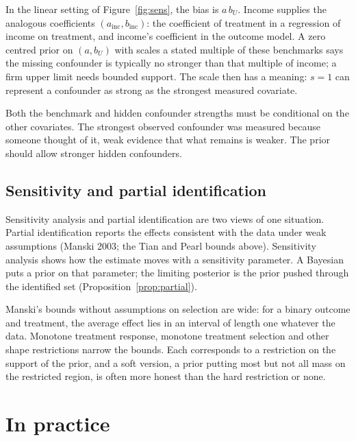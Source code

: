 In the linear setting of Figure~\ref{fig:sens}, the bias is $a\,b_U$. Income supplies the analogous coefficients $(a_{\mathrm{inc}}, b_{\mathrm{inc}})$: the coefficient of treatment in a regression of income on treatment, and income's coefficient in the outcome model. A zero centred prior on $(a, b_U)$ with scales a stated multiple of these benchmarks says the missing confounder is typically no stronger than that multiple of income; a firm upper limit needs bounded support. The scale then has a meaning: $s = 1$ can represent a confounder as strong as the strongest measured covariate.

Both the benchmark and hidden confounder strengths must be conditional on the other covariates. The strongest observed confounder was measured because someone thought of it, weak evidence that what remains is weaker. The prior should allow stronger hidden confounders.

\subsection{Sensitivity and partial identification}

Sensitivity analysis and partial identification are two views of one situation. Partial identification reports the effects consistent with the data under weak assumptions (Manski 2003; the Tian and Pearl bounds above). Sensitivity analysis shows how the estimate moves with a sensitivity parameter. A Bayesian puts a prior on that parameter; the limiting posterior is the prior pushed through the identified set (Proposition~\ref{prop:partial}).

Manski's bounds without assumptions on selection are wide: for a binary outcome and treatment, the average effect lies in an interval of length one whatever the data. Monotone treatment response, monotone treatment selection and other shape restrictions narrow the bounds. Each corresponds to a restriction on the support of the prior, and a soft version, a prior putting most but not all mass on the restricted region, is often more honest than the hard restriction or none.

\section{In practice}

